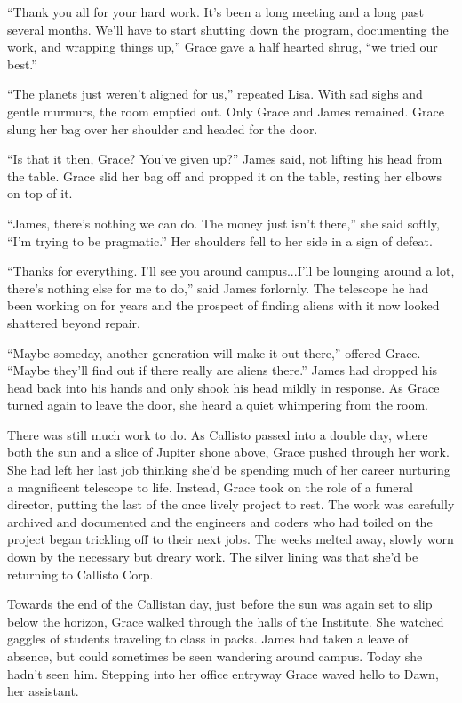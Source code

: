 \documentclass[openany, 12pt]{book} %
\begin{document}
``Thank you all for your hard work. It's been a long meeting and a long past several months. We'll have to start shutting down the program, documenting the work, and wrapping things up,'' Grace gave a half hearted shrug, ``we tried our best.''

``The planets just weren't aligned for us,'' repeated Lisa. With sad sighs and gentle murmurs, the room emptied out. Only Grace and James remained. Grace slung her bag over her shoulder and headed for the door.

``Is that it then, Grace? You've given up?'' James said, not lifting his head from the table. Grace slid her bag off and propped it on the table, resting her elbows on top of it.

``James, there's nothing we can do. The money just isn't there,'' she said softly, ``I'm trying to be pragmatic.'' Her shoulders fell to her side in a sign of defeat.

``Thanks for everything. I'll see you around campus...I'll be lounging around a lot, there's nothing else for me to do,'' said James forlornly. The telescope he had been working on for years and the prospect of finding aliens with it now looked shattered beyond repair. 

``Maybe someday, another generation will make it out there,'' offered Grace. ``Maybe they'll find out if there really are aliens there.'' James had dropped his head back into his hands and only shook his head mildly in response. As Grace turned again to leave the door, she heard a quiet whimpering from the room.

There was still much work to do. As Callisto passed into a double day, where both the sun and a slice of Jupiter shone above, Grace pushed through her work. She had left her last job thinking she'd be spending much of her career nurturing a magnificent telescope to life. Instead, Grace took on the role of a funeral director, putting the last of the once lively project to rest. The work was carefully archived and documented and the engineers and coders who had toiled on the project began trickling off to their next jobs. The weeks melted away, slowly worn down by the necessary but dreary work. The silver lining was that she'd be returning to Callisto Corp.

Towards the end of the Callistan day, just before the sun was again set to slip below the horizon, Grace walked through the halls of the Institute. She watched gaggles of students traveling to class in packs. James had taken a leave of absence, but could sometimes be seen wandering around campus. Today she hadn't seen him. Stepping into her office entryway Grace waved hello to Dawn, her assistant.
\end{document}
